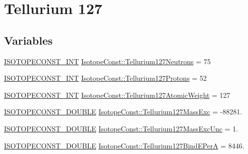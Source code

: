 \hypertarget{group___isotope_const-_tellurium-_te127}{}\section{Tellurium 127}
\label{group___isotope_const-_tellurium-_te127}
\subsection*{Variables}
\begin{DoxyCompactItemize}
\item 
\mbox{\hyperlink{group___isotope_const-_macros_ga5f18360b3e99483a35c32d789e62621c}{I\+S\+O\+T\+O\+P\+E\+C\+O\+N\+S\+T\+\_\+\+I\+NT}} \mbox{\hyperlink{group___isotope_const-_tellurium-_te127_ga84432be42f5111ba4afd2978992ddad3}{Isotope\+Const\+::\+Tellurium127\+Neutrons}} = 75
\item 
\mbox{\hyperlink{group___isotope_const-_macros_ga5f18360b3e99483a35c32d789e62621c}{I\+S\+O\+T\+O\+P\+E\+C\+O\+N\+S\+T\+\_\+\+I\+NT}} \mbox{\hyperlink{group___isotope_const-_tellurium-_te127_ga6fff56b88fc5abd88d76881acbf0611c}{Isotope\+Const\+::\+Tellurium127\+Protons}} = 52
\item 
\mbox{\hyperlink{group___isotope_const-_macros_ga5f18360b3e99483a35c32d789e62621c}{I\+S\+O\+T\+O\+P\+E\+C\+O\+N\+S\+T\+\_\+\+I\+NT}} \mbox{\hyperlink{group___isotope_const-_tellurium-_te127_ga4b7c3ea0026bcc6e9e371ca4e6316a69}{Isotope\+Const\+::\+Tellurium127\+Atomic\+Weight}} = 127
\item 
\mbox{\hyperlink{group___isotope_const-_macros_ga8f45a7272ce02c0b4c65c44636ed719a}{I\+S\+O\+T\+O\+P\+E\+C\+O\+N\+S\+T\+\_\+\+D\+O\+U\+B\+LE}} \mbox{\hyperlink{group___isotope_const-_tellurium-_te127_gabc1b0c9001e606d6c6a1080981ade508}{Isotope\+Const\+::\+Tellurium127\+Mass\+Exc}} = -\/88281.
\item 
\mbox{\hyperlink{group___isotope_const-_macros_ga8f45a7272ce02c0b4c65c44636ed719a}{I\+S\+O\+T\+O\+P\+E\+C\+O\+N\+S\+T\+\_\+\+D\+O\+U\+B\+LE}} \mbox{\hyperlink{group___isotope_const-_tellurium-_te127_gaf3ca040aa48b8a66a06a8680f0ac1fbe}{Isotope\+Const\+::\+Tellurium127\+Mass\+Exc\+Unc}} = 1.
\item 
\mbox{\hyperlink{group___isotope_const-_macros_ga8f45a7272ce02c0b4c65c44636ed719a}{I\+S\+O\+T\+O\+P\+E\+C\+O\+N\+S\+T\+\_\+\+D\+O\+U\+B\+LE}} \mbox{\hyperlink{group___isotope_const-_tellurium-_te127_ga446f722d18ed4feecdfa422fa5636086}{Isotope\+Const\+::\+Tellurium127\+Bind\+E\+PerA}} = 8446.
\item 

\end{DoxyCompactItemize}
